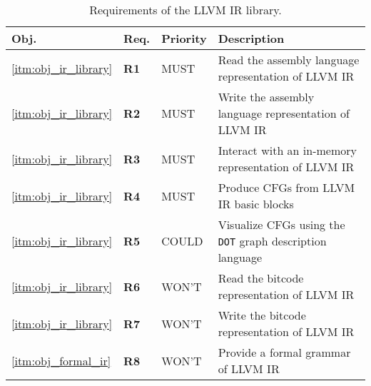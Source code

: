 \begin{table}[htbp]
	\begin{center}
		\begin{tabular}{|l|l|l|l|}
			\hline
			Obj. & Req. & Priority & Description \\
			\hline
			\ref{itm:obj_ir_library} & \textbf{R1} & MUST & Read the assembly language representation of LLVM IR \\
			\ref{itm:obj_ir_library} & \textbf{R2} & MUST & Write the assembly language representation of LLVM IR \\
			\ref{itm:obj_ir_library} & \textbf{R3} & MUST & Interact with an in-memory representation of LLVM IR \\
			\ref{itm:obj_ir_library} & \textbf{R4} & MUST & Produce CFGs from LLVM IR basic blocks \\
			\ref{itm:obj_ir_library} & \textbf{R5} & COULD & Visualize CFGs using the \texttt{DOT} graph description language \\
			\ref{itm:obj_ir_library} & \textbf{R6} & WON'T & Read the bitcode representation of LLVM IR \\
			\ref{itm:obj_ir_library} & \textbf{R7} & WON'T & Write the bitcode representation of LLVM IR \\
			\ref{itm:obj_formal_ir} & \textbf{R8} & WON'T & Provide a formal grammar of LLVM IR \\
			\hline
		\end{tabular}
	\end{center}
	\caption{Requirements of the LLVM IR library.}
\end{table}
